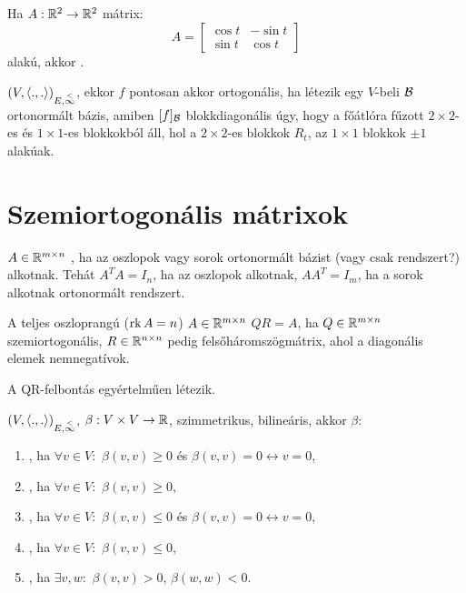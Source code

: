 \begin{ff}
	Ha $A:\mathbb{R}^2\to \mathbb{R}^2$ mátrix:
	\begin{equation*}
		A=	
		\begin{bmatrix}
			\cos t & -\sin t\\
			\sin t & \cos t
		\end{bmatrix}
	\end{equation*}
	alakú, akkor .
\end{ff}

\begin{jel}
\end{jel}

\begin{tet}
	$(V,\langle.,.\rangle)_{E,\overset{<}{\infty}}$, ekkor $f$ pontosan akkor ortogonális, ha létezik egy
	$V$-beli $\mathcal{B}$ ortonormált bázis, amiben $[f]_{\mathcal{B}}$ blokkdiagonális úgy, hogy
	a főátlóra fűzott $2\times 2$-es és $1\times 1$-es blokkokból áll, hol a
	$2\times 2$-es blokkok $R_t$, az $1\times 1$
	blokkok $\pm1$ alakúak.
\end{tet}


\section{Szemiortogonális mátrixok}
\begin{ff}
	$A\in\mathbb{R}^{m\times n}$ , ha az oszlopok vagy sorok ortonormált
	bázist (vagy csak rendszert?) alkotnak. Tehát $A^TA=I_n$, ha az oszlopok
	alkotnak, $AA^T=I_m$, ha a sorok alkotnak ortonormált rendszert.
\end{ff}
\begin{ff}
	A teljes oszloprangú ($\operatorname{rk}{A}=n$) $A\in\mathbb{R}^{m\times n}$  $QR=A$, ha
	$Q\in\mathbb{R}^{m\times n}$ szemiortogonális, $R\in\mathbb{R}^{n\times n}$ pedig felsőháromszögmátrix, ahol a
	diagonális elemek nemnegatívok.
\end{ff}
\begin{tet}
	A QR-felbontás egyértelműen létezik.
\end{tet}
\begin{ff}
	$(V,\langle.,.\rangle)_{E,\overset{<}{\infty}}$, $\beta:V\times V\to \mathbb{R}$, szimmetrikus, bilineáris, akkor
$\beta:$	
	\begin{enumerate}
		\item {}, ha $\forall v\in V:$ $\beta(v,v)\ge 0$ és
			$\beta(v,v)=0\leftrightarrow v=0$,
		\item {}, ha $\forall v\in V:$ $\beta(v,v)\ge 0$,
		\item {}, ha $\forall v\in V:$ $\beta(v,v)\leq 0$ és
			$\beta(v,v)=0\leftrightarrow v=0$,
		\item {}, ha $\forall v\in V:$ $\beta(v,v)\leq 0$,
		\item {}, ha $\exists v,w:$ $\beta(v,v)>0$, $\beta(w,w)<0$.
	\end{enumerate}
\end{ff}

